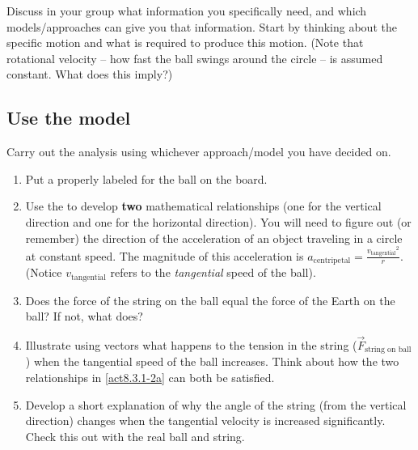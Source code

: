 \noindent Discuss in your group what information you specifically need, and which models/approaches can give you that information. Start by thinking about the specific motion and what is required to produce this motion. (Note that rotational velocity -- how fast the ball swings around the circle -- is assumed constant. What does this imply?)

\subsection*{Use the model}

Carry out the analysis using whichever approach/model you have decided on.
\begin{enumerate}
	\item Put a properly labeled \forcediag{} for the ball on the board.
	\label{act8.3.1-2a}
	
	\item Use the \forcediag{} to develop \textbf{two} mathematical relationships (one for the vertical direction and one for the horizontal direction). You will need to figure out (or remember) the direction of the acceleration of an object traveling in a circle at constant speed. The magnitude of this acceleration is $a_\text{centripetal} = \frac{v_\text{tangential}{}^2}{r}$.\\(Notice $v_\text{tangential}$ refers to the \emph{tangential} speed of the ball).
	
	\item Does the force of the string on the ball equal the force of the Earth on the ball? If not, what does?
	
\WCD
\vspace{2pt}

	\item Illustrate using vectors what happens to the tension in the string ($\vec{F}_\text{string on ball}$) when the tangential speed of the ball increases. Think about how the two relationships in \eqref{act8.3.1-2a} can both be satisfied.
	
	\item Develop a short explanation of why the angle of the string (from the vertical direction) changes when the tangential velocity is increased significantly. Check this out with the real ball and string.
\end{enumerate}

\WCD
